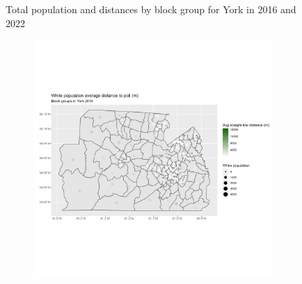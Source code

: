 \documentclass[11pt]{article}
\theoremstyle{remark}
\theoremstyle{definition}
\begin{document}
\begin{figure}
\begin{subfigure}{.5\textwidth}
		\label{sfig:York_2022_bg_dist}
	\end{subfigure}
	\caption{Total population and distances by block group for York in 2016 and 2022}
	\label{fig:York distance Total population maps}
\end{figure}

\begin{figure}
	\begin{subfigure}{.5\textwidth}
		\centering
		\includegraphics[width=\linewidth]{result analysis/York_SC_original_configs/white_pop_and_dist_York_config_original_2016_polls.png}
		\label{sfig:York_2016_bg_dist_pop}
	\end{subfigure} 
	\begin{subfigure}{.5\textwidth}
		\centering

\end{subfigure}
\end{figure}
\end{document}
